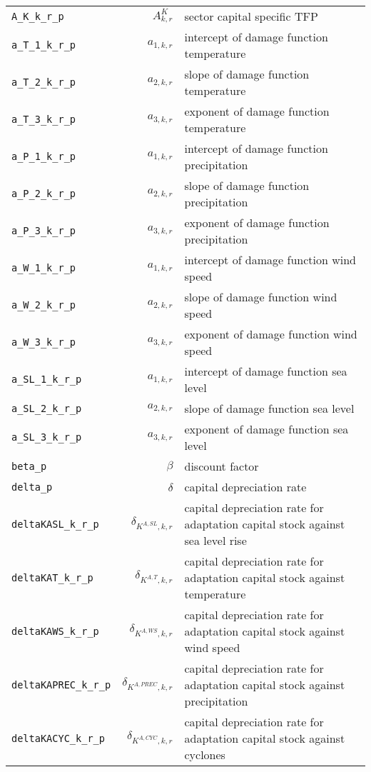 \begin{center}
\begin{longtable}{lrl}
\texttt{A\_K\_k\_r\_p} & ${A^{K}_{k,r}}$ & sector capital specific TFP\\
\texttt{a\_T\_1\_k\_r\_p} & ${a_{1,k,r}}$ & intercept of damage function temperature\\
\texttt{a\_T\_2\_k\_r\_p} & ${a_{2,k,r}}$ & slope of damage function temperature\\
\texttt{a\_T\_3\_k\_r\_p} & ${a_{3,k,r}}$ & exponent of damage function temperature\\
\texttt{a\_P\_1\_k\_r\_p} & ${a_{1,k,r}}$ & intercept of damage function precipitation\\
\texttt{a\_P\_2\_k\_r\_p} & ${a_{2,k,r}}$ & slope of damage function precipitation\\
\texttt{a\_P\_3\_k\_r\_p} & ${a_{3,k,r}}$ & exponent of damage function precipitation\\
\texttt{a\_W\_1\_k\_r\_p} & ${a_{1,k,r}}$ & intercept of damage function wind speed\\
\texttt{a\_W\_2\_k\_r\_p} & ${a_{2,k,r}}$ & slope of damage function wind speed\\
\texttt{a\_W\_3\_k\_r\_p} & ${a_{3,k,r}}$ & exponent of damage function wind speed\\
\texttt{a\_SL\_1\_k\_r\_p} & ${a_{1,k,r}}$ & intercept of damage function sea level\\
\texttt{a\_SL\_2\_k\_r\_p} & ${a_{2,k,r}}$ & slope of damage function sea level\\
\texttt{a\_SL\_3\_k\_r\_p} & ${a_{3,k,r}}$ & exponent of damage function sea level\\
\texttt{beta\_p} & ${\beta}$ & discount factor\\
\texttt{delta\_p} & ${\delta}$ & capital depreciation rate\\
\texttt{deltaKASL\_k\_r\_p} & ${\delta_{K^{A,SL},k,r}}$ & capital depreciation rate for adaptation capital stock against sea level rise\\
\texttt{deltaKAT\_k\_r\_p} & ${\delta_{K^{A,T},k,r}}$ & capital depreciation rate for adaptation capital stock against temperature\\
\texttt{deltaKAWS\_k\_r\_p} & ${\delta_{K^{A,WS},k,r}}$ & capital depreciation rate for adaptation capital stock against wind speed\\
\texttt{deltaKAPREC\_k\_r\_p} & ${\delta_{K^{A,PREC},k,r}}$ & capital depreciation rate for adaptation capital stock against precipitation\\
\texttt{deltaKACYC\_k\_r\_p} & ${\delta_{K^{A,CYC},k,r}}$ & capital depreciation rate for adaptation capital stock against cyclones\\

\end{longtable}
\end{center}
